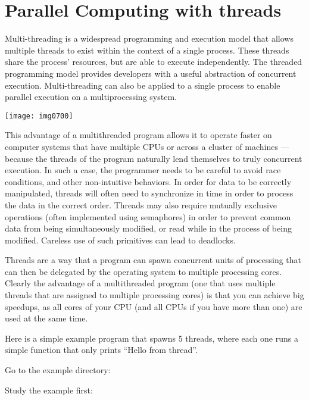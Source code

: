 \section{Parallel Computing with threads}

Multi-threading is a widespread programming and execution model that allows
multiple threads to exist within the context of a single process. These threads
share the process' resources, but are able to execute independently. The
threaded programming model provides developers with a useful abstraction of
concurrent execution. Multi-threading can also be applied to a single process
to enable parallel execution on a multiprocessing system.

\texttt{[image: img0700]}

This advantage of a multithreaded program allows it to operate faster on
computer systems that have multiple CPUs or across a cluster of machines ---
because the threads of the program naturally lend themselves to truly
concurrent execution. In such a case, the programmer needs to be careful to
avoid race conditions, and other non-intuitive behaviors. In order for data to
be correctly manipulated, threads will often need to synchronize in time in
order to process the data in the correct order. Threads may also require
mutually exclusive operations (often implemented using semaphores) in order to
prevent common data from being simultaneously modified, or read while in the
process of being modified. Careless use of such primitives can lead to
deadlocks.

Threads are a way that a program can spawn concurrent units of processing that
can then be delegated by the operating system to multiple processing cores.
Clearly the advantage of a multithreaded program (one that uses multiple
threads that are assigned to multiple processing cores) is that you can achieve
big speedups, as all cores of your CPU (and all CPUs if you have more than one)
are used at the same time.

Here is a simple example program that spawns 5 threads, where each one runs a
simple function that only prints ``Hello from thread''.

Go to the example directory:

\begin{prompt}
\end{prompt}

Study the example first:


